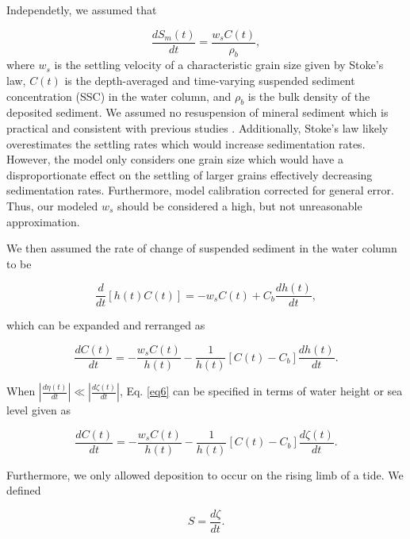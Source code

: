 \documentclass[a4paper,fleqn]{cas-dc}
\begin{document}
Independetly, we assumed that

\begin{equation}\label{eq4}
	\frac{dS_m(t)}{dt} = \frac{w_s C(t)}{\rho_b},
\end{equation}
where $w_s$ is the settling velocity of a characteristic grain size given by Stoke's law, $C(t)$ is the depth-averaged and time-varying suspended sediment concentration (SSC) in the water column, and $\rho_b$ is the bulk density of the deposited sediment. We assumed no resuspension of mineral sediment which is practical and consistent with previous studies \citep{kroneMethodSimulatingMarsh1987, allenSaltmarshGrowthStratification1990, frenchNumericalSimulationVertical1993, temmermanModellingLongtermTidal2003, temmermanModellingEstuarineVariations2004}. Additionally, Stoke's law likely overestimates the settling rates which would increase sedimentation rates. However, the model only considers one grain size which would have a disproportionate effect on the settling of larger grains effectively decreasing sedimentation rates. Furthermore, model calibration corrected for general error. Thus, our modeled $w_s$ should be considered a high, but not unreasonable approximation.

We then assumed the rate of change of suspended sediment in the water column to be

\begin{equation}\label{eq5}
	\frac{d}{dt}[h(t)C(t)] = -w_s C(t) + C_b \frac{dh(t)}{dt},
\end{equation}

which can be expanded and rerranged as

\begin{equation}\label{eq6}
	\frac{dC(t)}{dt} = - \frac{w_s C(t)}{h(t)} - \frac{1}{h(t)} [C(t) - C_b] \frac{dh(t)}{dt}.
\end{equation}

When $\displaystyle\left\lvert \frac{d\eta(t)}{dt} \right\rvert \ll \displaystyle\left\lvert \frac{d\zeta(t)}{dt} \right\rvert$, Eq. \ref{eq6} can be specified in terms of water height or sea level given as

\begin{equation}\label{eq7}
	\frac{dC(t)}{dt} = - \frac{w_s C(t)}{h(t)} - \frac{1}{h(t)} [C(t) - C_b] \frac{d\zeta(t)}{dt}.
\end{equation}

Furthermore, we only allowed deposition to occur on the rising limb of a tide. We defined 

\begin{equation}\label{eq8}
  S = \frac{d\zeta}{dt}.
\end{equation}
\end{document}
